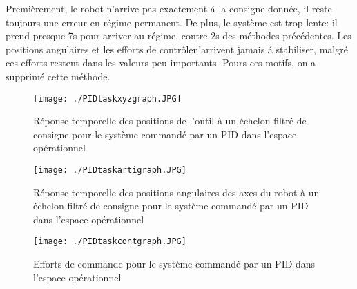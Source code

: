 Premièrement, le robot n'arrive pas exactement á la consigne donnée, il reste toujours une erreur en régime permanent. De plus, le système est trop lente: il prend presque 7s pour arriver au régime, contre 2s des méthodes précédentes. Les positions angulaires et les efforts de contrôlen'arrivent jamais á stabiliser, malgré ces efforts restent dans les valeurs peu importants. Pours ces motifs, on a supprimé cette méthode.

\begin{figure}[H]
	\begin{center}	
		\captionsetup{justification=centering,margin=1cm}
		\texttt{[image: ./PIDtaskxyzgraph.JPG]}
		\caption{Réponse temporelle des positions de l'outil à un échelon filtré de consigne pour le système commandé par un PID dans l'espace opérationnel}
		\label{fig:PIDtaskxyzgraph}
	\end{center}
\end{figure}

\begin{figure}[H]
	\begin{center}	
		\captionsetup{justification=centering,margin=1cm}
		\texttt{[image: ./PIDtaskartigraph.JPG]}
		\caption{Réponse temporelle des positions angulaires des axes du robot à un échelon filtré de consigne pour le système commandé par un PID dans l'espace opérationnel}
		\label{fig:PIDtaskartigraph}
	\end{center}
\end{figure}
\newpage
\begin{figure}[H]
	\begin{center}	
		\captionsetup{justification=centering,margin=1cm}
		\texttt{[image: ./PIDtaskcontgraph.JPG]}
		\caption{Efforts de commande pour le système commandé par un PID dans l'espace opérationnel}
		\label{fig:PIDtaskcontgraph}
	\end{center}
\end{figure}

